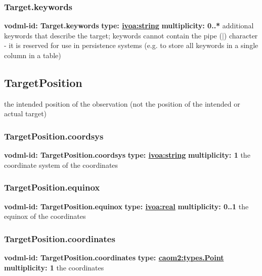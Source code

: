     \subsubsection{Target.keywords}
      \textbf{vodml-id: Target.keywords} \newline
      \textbf{type: \hyperref[sect:ivoa]{ivoa:string}} \newline
      \textbf{multiplicity: 0..*} \newline
      additional keywords that describe the target; keywords cannot contain the pipe (|) character - it is reserved for use in persistence systems (e.g. to store all keywords in a single column in a table)

  \subsection{TargetPosition}
  \label{sect:TargetPosition}
    the intended position of the observation (not the position of the intended or actual target)

    \subsubsection{TargetPosition.coordsys}
      \textbf{vodml-id: TargetPosition.coordsys} \newline
      \textbf{type: \hyperref[sect:ivoa]{ivoa:string}} \newline
      \textbf{multiplicity: 1} \newline
      the coordinate system of the coordinates

    \subsubsection{TargetPosition.equinox}
      \textbf{vodml-id: TargetPosition.equinox} \newline
      \textbf{type: \hyperref[sect:ivoa]{ivoa:real}} \newline
      \textbf{multiplicity: 0..1} \newline
      the equinox of the coordinates

    \subsubsection{TargetPosition.coordinates}
      \textbf{vodml-id: TargetPosition.coordinates} \newline
      \textbf{type: \hyperref[sect:types.Point]{caom2:types.Point}} \newline
      \textbf{multiplicity: 1} \newline
      the coordinates

